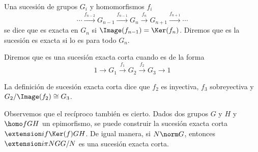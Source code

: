 \begin{definicion}
	Una sucesión de grupos $G_i$ y homomorfismos $f_i$
	\begin{equation*}
		\cdots \xrightarrow{f_{n-2}} G_{n-1} \xrightarrow{f_{n-1}} G_n \xrightarrow{f_{n}} G_{n+1} \xrightarrow{f_{n+1}} \cdots
	\end{equation*}
	se dice que es exacta en $G_n$ si $\Image(f_{n-1}) = \Ker(f_{n})$. Diremos que es la sucesión es exacta si lo es para todo $G_n$.
	
	Diremos que es una sucesión exacta corta cuando es de la forma
	\begin{equation}\label{eq:sec}
		1\xrightarrow{} G_1 \xrightarrow{f_1} G_2\xrightarrow{f_2} G_3 \xrightarrow{} 1
	\end{equation}
\end{definicion}

\begin{observacion}\label{obs:exact}
	La definición de sucesión exacta corta dice que $f_2$ es inyectiva, $f_3$ sobreyectiva y $G_2/\Image(f_2)\cong G_3$.
	 
	Observemos que el recíproco también es cierto. %
	Dados dos grupos $G$ y $H$ y $\homo f G H$ un epimorfismo, se puede construir la sucesión exacta corta $\extension i f {\Ker(f)} G H$.
	De igual manera, si $N \norm G$, entonces $\extension i \pi N G {G/N}$ es una sucesión exacta corta.
\end{observacion}
%		
%		

